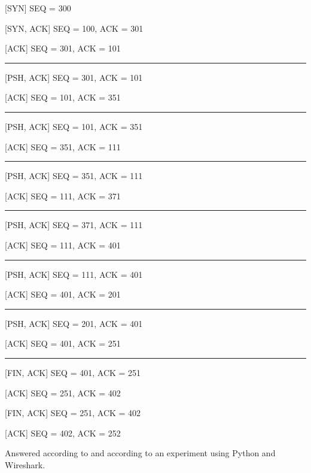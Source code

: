 \begin{Answer}

[SYN] SEQ = 300

\hspace*{\fill} [SYN, ACK] SEQ = 100, ACK = 301

[ACK] SEQ = 301, ACK = 101

\noindent\rule[0.5ex]{\linewidth}{1pt}

[PSH, ACK] SEQ = 301, ACK = 101

\hspace*{\fill} [ACK] SEQ = 101, ACK = 351

\noindent\rule[0.5ex]{\linewidth}{0.5pt}

\hspace*{\fill} [PSH, ACK] SEQ = 101, ACK = 351

[ACK] SEQ = 351, ACK = 111

\noindent\rule[0.5ex]{\linewidth}{0.5pt}

[PSH, ACK] SEQ = 351, ACK = 111

\hspace*{\fill} [ACK] SEQ = 111, ACK = 371

\noindent\rule[0.5ex]{\linewidth}{0.5pt}

[PSH, ACK] SEQ = 371, ACK = 111

\hspace*{\fill} [ACK] SEQ = 111, ACK = 401

\noindent\rule[0.5ex]{\linewidth}{0.5pt}

\hspace*{\fill} [PSH, ACK] SEQ = 111, ACK = 401

[ACK] SEQ = 401, ACK = 201

\noindent\rule[0.5ex]{\linewidth}{0.5pt}

\hspace*{\fill} [PSH, ACK] SEQ = 201, ACK = 401

[ACK] SEQ = 401, ACK = 251

\noindent\rule[0.5ex]{\linewidth}{1pt}

[FIN, ACK] SEQ = 401, ACK = 251

\hspace*{\fill} [ACK] SEQ = 251, ACK = 402

\hspace*{\fill} [FIN, ACK] SEQ = 251, ACK = 402

[ACK] SEQ = 402, ACK = 252

Answered according to \cite{computer-networking-kurose-2012} and according to an experiment using Python and Wireshark.
\end{Answer}

